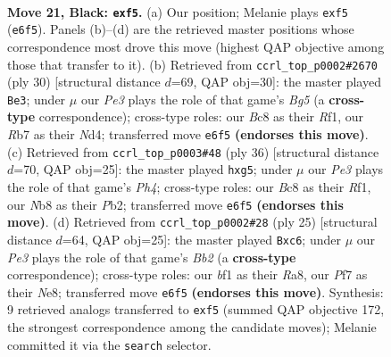 \documentclass[11pt]{article}
\begin{document}
\clearpage

\begin{figure}[p]\centering
\begin{subfigure}{0.46\textwidth}\centering
\resizebox{\linewidth}{!}{%
\newchessgame
\chessboard[
  setfen={1nb1qrk1/1r3ppp/4p3/2ppPN2/p4P2/6K1/PPP3PP/R2Q1BNR b - - 0 21},
  showmover=false,
  pgfstyle=straightmove, color=movearrow, markmove={e6-f5}
]}
\caption{}
\end{subfigure}\hfill
\begin{subfigure}{0.46\textwidth}\centering
\resizebox{\linewidth}{!}{%
\newchessgame
\chessboard[
  setfen={2r1k2r/1pq1bpp1/p2ppn1p/6B1/3NP2P/5P2/PPPQ2P1/1K1R1R2 w k - 0 16},
  showmover=false,
  pgfstyle=straightmove, color=movearrow, markmove={g5-e3}
]}
\caption{}
\end{subfigure}
\\[4pt]
\begin{subfigure}{0.46\textwidth}\centering
\resizebox{\linewidth}{!}{%
\newchessgame
\chessboard[
  setfen={2r1k2r/2qn1pp1/p1bpp3/1p4bp/4P2P/3B1P2/PPP1NQP1/1K1R1R2 w k - 0 19},
  showmover=false,
  pgfstyle=straightmove, color=movearrow, markmove={h4-g5}
]}
\caption{}
\end{subfigure}\hfill
\begin{subfigure}{0.46\textwidth}\centering
\resizebox{\linewidth}{!}{%
\newchessgame
\chessboard[
  setfen={r3nrk1/pb1pqpp1/1pN1p2p/4P3/8/2PB4/PP1NQPPP/R3K2R b KQ - 0 13},
  showmover=false,
  pgfstyle=straightmove, color=movearrow, markmove={b7-c6}
]}
\caption{}
\end{subfigure}
\caption{\textbf{Move 21, Black: \texttt{exf5}.} (a) Our position; Melanie plays \texttt{exf5} (\texttt{e6f5}). Panels (b)--(d) are the retrieved master positions whose correspondence most drove this move (highest QAP objective among those that transfer to it). (b) Retrieved from \texttt{ccrl\_top\_p0002\#2670} (ply 30) [structural distance $d$=69, QAP obj=30]: the master played \texttt{Be3}; under $\mu$ our \emph{Pe3} plays the role of that game's \emph{Bg5} (a \textbf{cross-type} correspondence); cross-type roles: our \emph{B}c8 as their \emph{R}f1, our \emph{R}b7 as their \emph{N}d4; transferred move \texttt{e6f5} \textbf{(endorses this move)}. (c) Retrieved from \texttt{ccrl\_top\_p0003\#48} (ply 36) [structural distance $d$=70, QAP obj=25]: the master played \texttt{hxg5}; under $\mu$ our \emph{Pe3} plays the role of that game's \emph{Ph4}; cross-type roles: our \emph{B}c8 as their \emph{R}f1, our \emph{N}b8 as their \emph{P}b2; transferred move \texttt{e6f5} \textbf{(endorses this move)}. (d) Retrieved from \texttt{ccrl\_top\_p0002\#28} (ply 25) [structural distance $d$=64, QAP obj=25]: the master played \texttt{Bxc6}; under $\mu$ our \emph{Pe3} plays the role of that game's \emph{Bb2} (a \textbf{cross-type} correspondence); cross-type roles: our \emph{b}f1 as their \emph{R}a8, our \emph{P}f7 as their \emph{N}e8; transferred move \texttt{e6f5} \textbf{(endorses this move)}. Synthesis: 9 retrieved analogs transferred to \texttt{exf5} (summed QAP objective 172, the strongest correspondence among the candidate moves); Melanie committed it via the \texttt{search} selector.}
\label{fig:thought-m41}
\end{figure}
\end{document}
